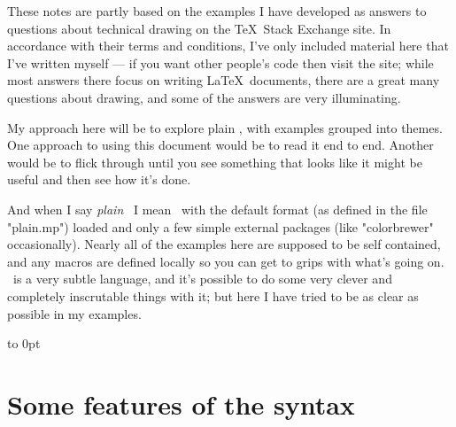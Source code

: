 \documentclass[a4paper,landscape]{article}
\begin{document}
These notes are partly based on the examples I have developed as answers
to questions about technical drawing on the \TeX\ Stack Exchange site.  In
accordance with their terms and conditions, I’ve only included material here that
I’ve written myself --- if you want other people’s code then visit the site;
while most answers there focus on writing \LaTeX\ documents, there are a great
many questions about drawing, and some of the answers are very illuminating.

My approach here will be to explore plain \MP, with examples grouped
into themes.  One approach to using this document would be to read it end to end.
Another would be to flick through until you see something that looks like it might
be useful and then see how it’s done.

And when I say \textit{plain} \MP\ I mean \MP\ with the default format (as defined
in the file "plain.mp") loaded and only a few simple external packages (like
"colorbrewer" occasionally).  Nearly all of the examples here are supposed to be self
contained, and any macros are defined locally so you can get to grips with what’s
going on.  \MP\ is a very subtle language, and it’s possible to do some very clever
and completely inscrutable things with it;  but here I have tried to be as clear as
possible in my examples.

\vbox to 0pt{
\vskip 1in
\noindent
\begingroup\footnotesize{}\endgroup\par\vss}

\newpage
\section{Some features of the syntax}
\end{document}
